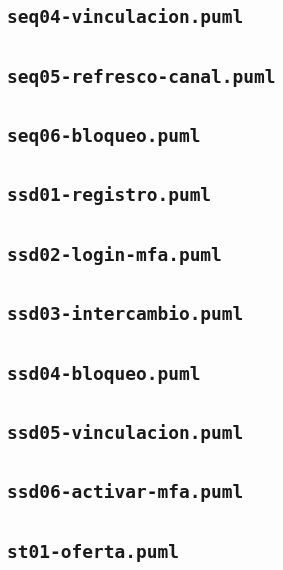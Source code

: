 \documentclass[11pt,a4paper]{report}
\begin{document}
\subsection*{\texttt{seq04-vinculacion.puml}}

\subsection*{\texttt{seq05-refresco-canal.puml}}

\subsection*{\texttt{seq06-bloqueo.puml}}

\subsection*{\texttt{ssd01-registro.puml}}

\subsection*{\texttt{ssd02-login-mfa.puml}}

\subsection*{\texttt{ssd03-intercambio.puml}}

\subsection*{\texttt{ssd04-bloqueo.puml}}

\subsection*{\texttt{ssd05-vinculacion.puml}}

\subsection*{\texttt{ssd06-activar-mfa.puml}}

\subsection*{\texttt{st01-oferta.puml}}

\end{document}
